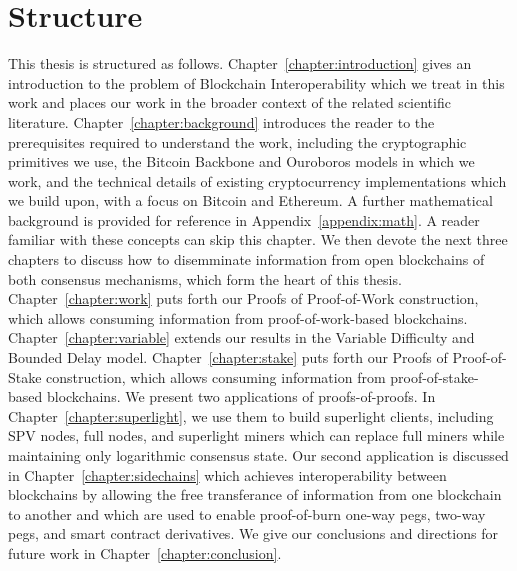 \section*{Structure}

This thesis is structured as follows. Chapter~\ref{chapter:introduction} gives
an introduction to the problem of Blockchain Interoperability which we treat in
this work and places our work in the broader context of the related scientific
literature. Chapter~\ref{chapter:background} introduces the reader to the
prerequisites required to understand the work, including the cryptographic
primitives we use, the Bitcoin Backbone and Ouroboros models in which we work, and the
technical details of existing cryptocurrency implementations which we build
upon, with a focus on Bitcoin and Ethereum. A further mathematical background is
provided for reference in Appendix~\ref{appendix:math}. A reader familiar with
these concepts can skip this chapter. We then devote the next three chapters to
discuss how to disemminate information from open blockchains of both consensus
mechanisms, which form the heart of this thesis. Chapter~\ref{chapter:work} puts forth our Proofs of Proof-of-Work
construction, which allows consuming information from proof-of-work-based
blockchains. Chapter~\ref{chapter:variable} extends our results in the Variable Difficulty and Bounded Delay model. Chapter~\ref{chapter:stake} puts forth our Proofs of
Proof-of-Stake construction, which allows consuming information from
proof-of-stake-based blockchains. We present two applications of
proofs-of-proofs. In Chapter~\ref{chapter:superlight}, we use them to build
superlight clients, including SPV nodes, full nodes, and superlight miners which
can replace full miners while maintaining only logarithmic consensus state. Our
second application is discussed in Chapter~\ref{chapter:sidechains} which
achieves interoperability between blockchains by allowing the free transferance
of information from one blockchain to another and which are used to enable proof-of-burn one-way pegs, two-way pegs, and smart contract derivatives. We give our conclusions and
directions for future work in Chapter~\ref{chapter:conclusion}.
